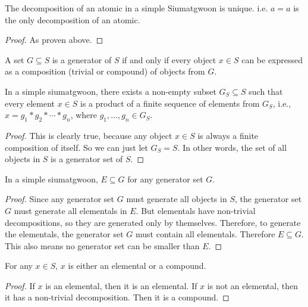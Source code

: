 \begin{lemma}[Atomics]\label{def:atomics}
    The decomposition of an atomic in a simple Siumatgwoon is unique. i.e. $a=a$ is the only decomposition of an atomic.
\end{lemma}
\begin{proof}
    As proven above.
\end{proof}



\begin{definition}[Generators]\label{def:generators}
    A set $G \subseteq S$ is a generator of $S$ if and only if every object $x \in S$ can be expressed as a composition (trivial or compound) of objects from $G$.
\end{definition}

\begin{theorem}\label{thm:generator-sets-exist-in-simple-siumatgwoons}
    In a simple siumatgwoon, there exists a non-empty subset $G_{S} \subseteq S$ such that every element $x \in S$ is a product of a finite sequence of elements from $G_S$, i.e., $x = g_1 * g_2 * \cdots * g_n$, where $g_1, \dots, g_n \in G_S$.
\end{theorem}

\begin{proof}
    This is clearly true, because any object $x\in S$ is always a finite composition of itself. So we can just let $G_S = S$. In other words, the set of all objects in $S$ is a generator set of $S$.
\end{proof}

\begin{lemma}\label{lem:elementals-are-in-every-generator-set}
    In a simple siumatgwoon, $E\subseteq G$ for any generator set $G$.
\end{lemma}
\begin{proof}
    Since any generator set $G$ must generate all objects in $S$, the generator set $G$ must generate all elementals in $E$. But elementals have non-trivial decompositions, so they are generated only by themselves. Therefore, to generate the elementals, the generator set $G$ must contain all elementals. Therefore $E\subseteq G$. This also means no generator set can be smaller than $E$.
\end{proof}

\begin{lemma}\label{lem:elementals-are-not-compounds}
    For any $x\in S$, $x$ is either an elemental or a compound.
\end{lemma}
\begin{proof}
    If $x$ is an elemental, then it is an elemental. If $x$ is not an elemental, then it has a non-trivial decomposition. Then it is a compound.
\end{proof}




